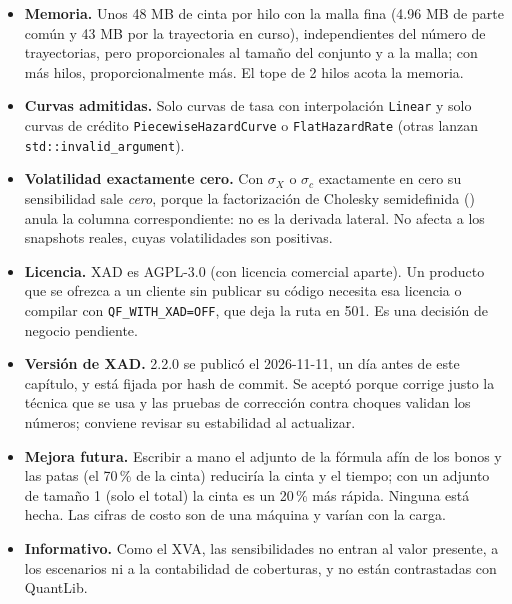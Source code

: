 \begin{limites}
\begin{itemize}
          hilos y la adjunta en dos, de 15 a 23 veces el tiempo de una valuación, y decenas de segundos en conjuntos
          largos (26 s el conjunto de 3 operaciones a 10 años). Es 5 veces más barata que los choques ($2m$
          valuaciones, que se estiman con la valuación en todos los hilos y no se corrieron) con 48 insumos, pero no
          instantánea; por eso se calcula a petición. Todas las cifras son de la compilación de depuración que sirve
          la API.
    \item \textbf{Memoria.} Unos 48 MB de cinta por hilo con la malla fina (4.96 MB de parte común y 43 MB por la
          trayectoria en curso), independientes del número de trayectorias, pero proporcionales al tamaño del conjunto y
          a la malla; con más hilos, proporcionalmente más. El tope de 2 hilos acota la memoria.
    \item \textbf{Curvas admitidas.} Solo curvas de tasa con interpolación \texttt{Linear} y solo curvas de crédito
          \texttt{PiecewiseHazardCurve} o \texttt{FlatHazardRate} (otras lanzan \texttt{std::invalid\_argument}).
    \item \textbf{Volatilidad exactamente cero.} Con $\sigma_X$ o $\sigma_c$ exactamente en cero su sensibilidad sale
          \emph{cero}, porque la factorización de Cholesky semidefinida
          () anula la columna correspondiente: no es la derivada
          lateral. No afecta a los snapshots reales, cuyas volatilidades son positivas.
    \item \textbf{Licencia.} XAD es AGPL-3.0 (con licencia comercial aparte). Un producto que se ofrezca a un cliente sin
          publicar su código necesita esa licencia o compilar con \texttt{QF\_WITH\_XAD=OFF}, que deja la ruta en 501.
          Es una decisión de negocio pendiente.
    \item \textbf{Versión de XAD.} 2.2.0 se publicó el 2026-11-11, un día antes de este capítulo, y está fijada por hash
          de commit. Se aceptó porque corrige justo la técnica que se usa y las pruebas de corrección contra choques
          validan los números; conviene revisar su estabilidad al actualizar.
    \item \textbf{Mejora futura.} Escribir a mano el adjunto de la fórmula afín de los bonos y las patas (el 70\,\% de
          la cinta) reduciría la cinta y el tiempo; con un adjunto de tamaño 1 (solo el total) la cinta es un 20\,\% más
          rápida. Ninguna está hecha. Las cifras de costo son de una máquina y varían con la carga.
    \item \textbf{Informativo.} Como el XVA, las sensibilidades no entran al valor presente, a los escenarios ni a la
          contabilidad de coberturas, y no están contrastadas con QuantLib.
  \end{itemize}
\end{limites}

